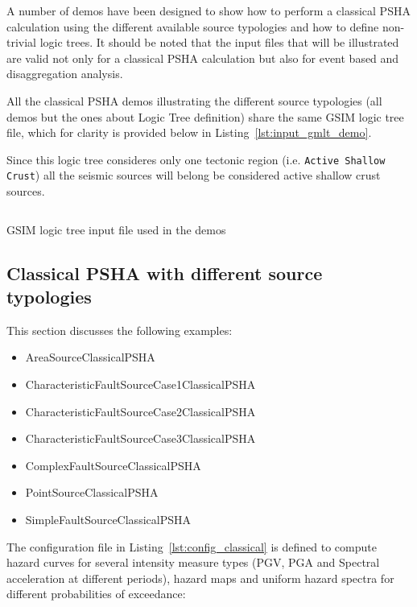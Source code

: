 A number of demos have been designed to show how to perform a classical PSHA
calculation using the different available source typologies and how to define
non-trivial logic trees. It should be  noted that the input files that will be
illustrated are valid not only for a classical PSHA calculation but also for
event based and  disaggregation analysis.

All the classical PSHA demos illustrating the different source typologies (all
demos but the ones about Logic Tree definition) share the same GSIM logic tree
file, which for clarity is provided below in
Listing~\ref{lst:input_gmlt_demo}.

Since this logic tree consideres only one tectonic region (i.e. \texttt{Active
Shallow Crust}) all the seismic sources will belong be considered active
shallow crust sources.

\begin{listing}[htbp]
  \inputminted[firstline=1,firstnumber=1,fontsize=\footnotesize,frame=single,linenos,bgcolor=lightgray]{xml}{oqum/hazard/verbatim/input_gmlt.xml}
  \caption{GSIM logic tree input file used in the demos}
  \label{lst:input_gmlt_demo}
\end{listing}

\subsection{Classical PSHA with different source typologies}

This section discusses the following examples:

\begin{itemize}
    \item AreaSourceClassicalPSHA
    \item CharacteristicFaultSourceCase1ClassicalPSHA
    \item CharacteristicFaultSourceCase2ClassicalPSHA
    \item CharacteristicFaultSourceCase3ClassicalPSHA
    \item ComplexFaultSourceClassicalPSHA
    \item PointSourceClassicalPSHA
    \item SimpleFaultSourceClassicalPSHA
\end{itemize}

The configuration file in Listing~\ref{lst:config_classical} is defined to
compute hazard curves for several intensity measure types (PGV, PGA and
Spectral acceleration at different periods), hazard maps and uniform hazard
spectra for different probabilities of exceedance:

